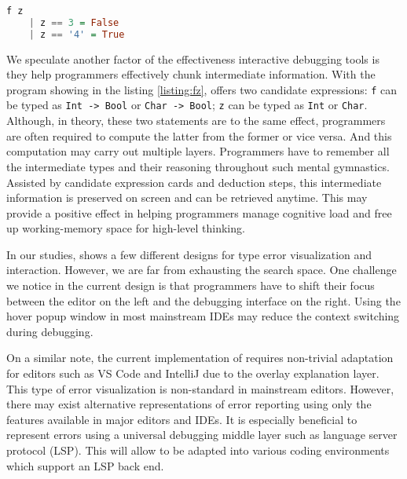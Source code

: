 \begin{lstlisting}[language=Haskell, float, caption={
    In this simple program, \chameleon{} report 
    the error happened in \texttt{f} and \texttt{z}.
}, label={listing:fz}]
f z     
    | z == 3 = False
    | z == '4' = True
\end{lstlisting}

We speculate another factor of the effectiveness \chameleon{} interactive debugging tools is they help programmers effectively chunk intermediate information. With the program showing in the listing \ref{listing:fz}, \chameleon{} offers two candidate expressions: \texttt{f} can be typed as \texttt{Int -> Bool} or \texttt{Char -> Bool}; \texttt{z} can be typed as \texttt{Int} or \texttt{Char}. Although, in theory, these two statements are to the same effect, programmers are often required to compute the latter from the former or vice versa. And this computation may carry out multiple layers. Programmers have to remember all the intermediate types and their reasoning throughout such mental gymnastics. Assisted by candidate expression cards and deduction steps, this intermediate information is preserved on screen and can be retrieved anytime. This may provide a positive effect in helping programmers manage cognitive load and free up working-memory space for high-level thinking.


In our studies, \chameleon{} shows a few different designs for type error visualization and interaction. However, we are far from exhausting the search space. One challenge we notice in the current design is that programmers have to shift their focus between the editor on the left and the \chameleon{} debugging interface on the right. Using the hover popup window in most mainstream IDEs may reduce the context switching during debugging.

On a similar note, the current implementation of \chameleon{} requires non-trivial adaptation for editors such as VS Code and IntelliJ due to the overlay explanation layer. This type of error visualization is non-standard in mainstream editors. However, there may exist alternative representations of \chameleon{} error reporting using only the features available in major editors and IDEs. It is especially beneficial to represent \chameleon{} errors using a universal debugging middle layer such as language server protocol (LSP). This will allow \chameleon{}  to be adapted into various coding environments which support an LSP back end.

